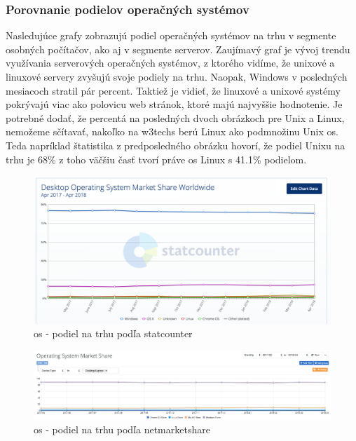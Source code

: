 \subsubsection{Porovnanie podielov operačných systémov}
\indent Nasledujúce grafy zobrazujú podiel operačných systémov na trhu v segmente osobných počítačov, ako aj v segmente serverov. Zaujímavý graf je vývoj trendu využívania serverových operačných systémov, z ktorého vidíme, že unixové a linuxové servery zvyšujú svoje podiely na trhu. Naopak, Windows v posledných mesiacoch stratil pár percent. Taktiež je vidieť, že linuxové a unixové systémy pokrývajú viac ako polovicu web stránok, ktoré majú najvyššie hodnotenie. Je potrebné dodať, že percentá na posledných dvoch obrázkoch pre Unix a Linux, nemožeme sčítavať, nakoľko na w3techs berú Linux ako podmnožinu Unix \acrshort{os}. Teda napríklad štatistika z predposledného obrázku hovorí, že podiel Unixu na trhu je 68\% z toho väčšiu časť tvorí práve \acrshort{os} Linux s 41.1\% podielom.
\begin{figure}[!htbp]
	\centering
	\includegraphics[width=\linewidth]{img/statcounter.png}
	\caption{\acrshort{os} - podiel na trhu podľa statcounter\cite{statcounter}}
	\label{fig:test}
	
\end{figure}
\begin{figure}[!htbp]
	\centering
	\includegraphics[width=\linewidth]{img/netmarketshare.png}
	\caption{\acrshort{os} - podiel na trhu podľa netmarketshare\cite{netmarketshare}}
	\label{fig:test}
	
\end{figure}
